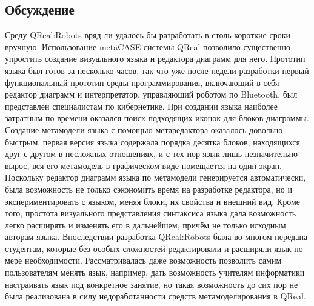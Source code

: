 \documentclass[a4paper]{article}
\begin{document}
\subsection{Обсуждение}
Среду QReal:Robots вряд ли удалось бы разработать в столь короткие сроки вручную. Использование metaCASE-системы QReal позволило существенно упростить создание визуального языка и редактора диаграмм для него. Прототип языка был готов за несколько часов, так что уже после недели разработки первый функциональный прототип среды программирования, включающий в себя редактор диаграмм и интерпретатор, управляющий роботом по Bluetooth, был представлен специалистам по кибернетике. При создании языка наиболее затратным по времени оказался поиск подходящих иконок для блоков диаграммы. Создание метамодели языка с помощью метаредактора оказалось довольно быстрым, первая версия языка содержала порядка десятка блоков, находящихся друг с другом в несложных отношениях, и с тех пор язык лишь незначительно вырос, вся его метамодель в графическом виде помещается на один экран. Поскольку редактор диаграмм языка по метамодели генерируется автоматически, была возможность не только сэкономить время на разработке редактора, но и экспериментировать с языком, меняя блоки, их свойства и внешний вид. Кроме того, простота визуального представления синтаксиса языка дала возможность легко расширять и изменять его в дальнейшем, причём не только исходным авторам языка. Впоследствии разработка QReal:Robots была во многом передана студентам, которые без особых сложностей редактировали и расширяли язык по мере необходимости. Рассматривалась даже возможность позволить самим пользователям менять язык, например, дать возможность учителям информатики настраивать язык под конкретное занятие, но такая возможность до сих пор не была реализована в силу недоработанности средств метамоделирования в QReal.
\end{document}
